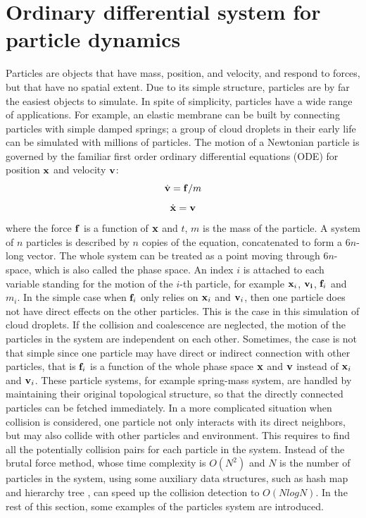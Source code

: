 \section{Ordinary differential system for particle dynamics}
Particles are objects that have mass, position, and velocity, and respond to forces, but that have no spatial extent. Due to its simple structure, particles are by far the easiest objects to simulate. In spite of simplicity, particles have a wide range of applications. For example, an elastic membrane can be built by connecting particles with simple damped springs; a group of cloud droplets in their early life can be simulated with millions of particles. The motion of a Newtonian particle is governed by the familiar first order ordinary differential equations (ODE) for position $\mathbf{x}$ and velocity $\mathbf{v}$:
\begin{equation}
\dot{\mathbf{v}} = \mathbf{f}/m
\label{dv_eqn}
\end{equation}
\begin{equation}
\dot{\mathbf{x}} = \mathbf{v}
\label{dx_eqn}
\end{equation}
where the force $\mathbf{f}$ is a function of $\mathbf{x}$ and $t$, $m$ is the mass of the particle. A system of $n$ particles is described by $n$ copies of the equation, concatenated to form a $6n$-long vector. The whole system can be treated as a point moving through $6n$-space, which is also called the phase space. An index $i$ is attached to each variable standing for the motion of the $i$-th particle, for example $\mathbf{x}_i$, $\mathbf{v_i}$, $\mathbf{f}_i$ and $m_i$. In the simple case when $\mathbf{f}_i$ only relies on $\mathbf{x}_i$ and $\mathbf{v}_i$, then one particle does not have direct effects on the other particles. This is the case in this simulation of cloud droplets. If the collision and coalescence are neglected, the motion of the particles in the system are independent on each other. Sometimes, the case is not that simple since one particle may have direct or indirect connection with other particles, that is $\mathbf{f}_i$ is a function of the whole phase space $\mathbf{x}$ and $\mathbf{v}$ instead of $\mathbf{x}_i$ and $\mathbf{v}_i$. These particle systems, for example spring-mass system, are handled by maintaining their original topological structure, so that the directly connected particles can be fetched immediately. In a more complicated situation when collision is considered, one particle not only interacts with its direct neighbors, but may also collide with other particles and environment. This requires to find all the potentially collision pairs for each particle in the system. Instead of the brutal force method, whose time complexity is $O(N^2)$ and $N$ is the number of particles in the system, using some auxiliary data structures, such as hash map \cite{TeschnerCollision2005} and hierarchy tree \cite{VolinoEfficient1994,BridsonRobust2002}, can speed up the collision detection to $O(NlogN)$. In the rest of this section, some examples of the particles system are introduced.

